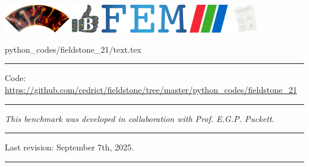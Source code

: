 \noindent
\includegraphics[height=1.25cm]{images/pictograms/aspect_logo}
\includegraphics[height=1.25cm]{images/pictograms/benchmark}
\includegraphics[height=1.25cm]{images/pictograms/FEM}
\includegraphics[height=1.25cm]{images/pictograms/paraview}
\includegraphics[height=1.25cm]{images/pictograms/publication}


\begin{flushright} {\tiny {\color{gray} python\_codes/fieldstone\_21/text.tex}} \end{flushright}

\par\noindent\rule{\textwidth}{0.4pt}

\begin{center}
\inpython
{\small Code: \url{https://github.com/cedrict/fieldstone/tree/master/python_codes/fieldstone_21}}
\end{center}

\par\noindent\rule{\textwidth}{0.4pt}

{\sl This benchmark was developed in collaboration with Prof. E.G.P. Puckett}. 

\par\noindent\rule{\textwidth}{0.4pt}

Last revision: September 7th, 2025.

\par\noindent\rule{\textwidth}{0.4pt}

